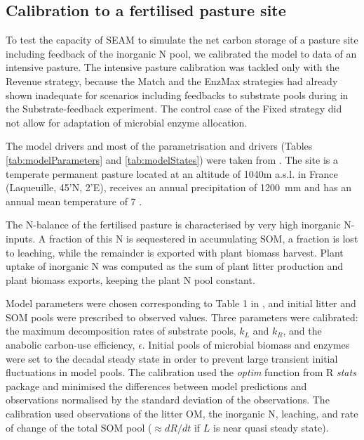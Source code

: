 \subsection{Calibration to a fertilised pasture site}
\label{sec:methodsPasture}

To test the capacity of SEAM to simulate the net carbon storage of a pasture
site including feedback of the inorganic N pool, we calibrated the model to data
of an intensive pasture. The intensive pasture calibration was tackled only with
the Revenue strategy, because the Match and the EnzMax strategies had already
shown inadequate for scenarios including feedbacks to substrate pools during
in the Substrate-feedback experiment. The control case of the Fixed
strategy did not allow for adaptation of microbial enzyme allocation. 

The model drivers and most of the parametrisation and drivers (Tables
\ref{tab:modelParameters} and \ref{tab:modelStates}) were taken from
\citet{Perveen14}.
The site is a temperate permanent pasture located at an altitude of 1040m
a.s.l. in France (Laqueuille, 45'N, 2'E), receives
an annual precipitation of 1200~mm and has an annual mean temperature of  7
. 

The N-balance of the fertilised pasture is characterised by very high inorganic
N-inputs. A fraction of this N is sequestered in accumulating SOM, a fraction is
lost to leaching, while the remainder is exported with plant biomass harvest.
Plant uptake of inorganic N was computed as the sum of plant litter production
and plant biomass exports, keeping the plant N pool constant.
 
Model parameters were chosen corresponding to Table 1 in \citet{Perveen14}, and
initial litter and SOM pools were prescribed to observed values.
Three parameters were calibrated: the maximum decomposition rates
of substrate pools, $k_L$ and $k_R$, and the anabolic carbon-use efficiency,
$\epsilon$. Initial pools of microbial biomass and enzymes were set to the
decadal steady state in order to prevent large transient initial
fluctuations in model pools. The calibration used the \textit{optim} function
from R \textit{stats} package \citep{R07} and minimised the differences between model
predictions and observations normalised by the standard deviation of the
observations. The calibration used observations of the litter OM, the inorganic
N, leaching, and rate of change of the total SOM pool ($\approx dR/dt$ if $L$ is
near quasi steady state). 

